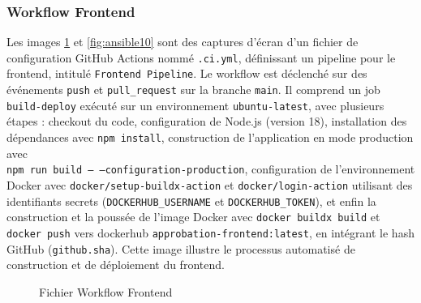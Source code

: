 \subsubsection{Workflow Frontend}
Les images \ref{fig:ansible9} et \ref{fig:ansible10} sont des captures d’écran d’un fichier de configuration GitHub Actions nommé \texttt{.ci.yml}, définissant un pipeline pour le frontend, intitulé \texttt{Frontend Pipeline}. Le workflow est déclenché sur des événements \texttt{push} et \texttt{pull\_request} sur la branche \texttt{main}. Il comprend un job \texttt{build-deploy} exécuté sur un environnement \texttt{ubuntu-latest}, avec plusieurs étapes : checkout du code, configuration de Node.js (version 18), installation des dépendances avec \texttt{npm install}, construction de l’application en mode production avec\\ \texttt{npm run build -- --configuration-production}, configuration de l’environnement Docker avec \texttt{docker/setup-buildx-action} et \texttt{docker/login-action} utilisant des identifiants secrets (\texttt{DOCKERHUB\_USERNAME} et \texttt{DOCKERHUB\_TOKEN}), et enfin la construction et la poussée de l’image Docker avec \texttt{docker buildx build} et \texttt{docker push} vers dockerhub \texttt{approbation-frontend:latest}, en intégrant le hash GitHub (\texttt{github.sha}). Cette image illustre le processus automatisé de construction et de déploiement du frontend.
\begin{figure}[h]
    \begin{adjustwidth}{-3.5cm}{-3.5cm}
    \centering
    \caption{Fichier Workflow Frontend}
    \label{fig:ansible9}
    \end{adjustwidth}
\end{figure}
